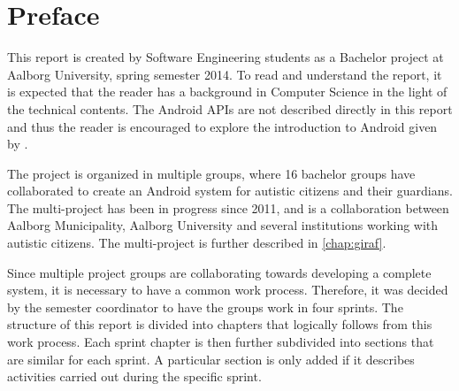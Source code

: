 \newcommand{\headerPreface}{Preface}
\cleardoublepage
{}
\pdfbookmark{\headerPreface}{chap:preface}
\chapter*{\headerPreface}\label{chap:preface}










This report is created by Software Engineering students as a Bachelor project at Aalborg University, spring semester 2014.
To read and understand the report, it is expected that the reader has a background in Computer Science in the light of the technical contents.
The Android APIs are not described directly in this report and thus the reader is encouraged to explore the introduction to Android given by \citet{androidIntroduction}.

The project is organized in multiple groups, where 16 bachelor groups have collaborated to create an Android system for autistic citizens and their guardians.
The multi-project has been in progress since 2011, and is a collaboration between Aalborg Municipality, Aalborg University and several institutions working with autistic citizens.
The multi-project is further described in \cref{chap:giraf}.

Since multiple project groups are collaborating towards developing a complete system, it is necessary to have a common work process.
Therefore, it was decided by the semester coordinator to have the groups work in four sprints.
The structure of this report is divided into chapters that logically follows from this work process.
Each sprint chapter is then further subdivided into sections that are similar for each sprint.
A particular section is only added if it describes activities carried out during the specific sprint.\\

